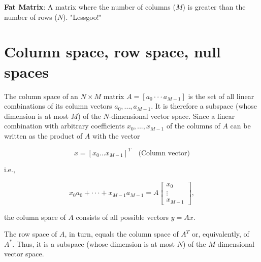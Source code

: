 \documentclass[a4paper, 12pt]{book}
\begin{document}
\begin{purplebox}
\textbf{Fat Matrix}: A matrix where the number of columns ($M$) is greater than the number of rows ($N$). "Lessgoo!"
\end{purplebox}

\section{Column space, row space, null spaces}

The column space of an $N \times M$ matrix $A=[a_{0} \cdot\cdot\cdot a_{M-1}]$ is the set of all linear combinations of its column vectors $a_{0},...,a_{M-1}.$ It is therefore a subspace (whose dimension is at most $M$) of the $N$-dimensional vector space. Since a linear combination with arbitrary coefficients $x_{0},...,x_{M-1}$ of the columns of $A$ can be written as the product of $A$ with the vector

\begin{equation}
    x = [x_0 \dots x_{M-1}]^T \quad \text{(Column vector)}
\end{equation}

i.e.,

\begin{equation}
    x_{0}a_{0}+\cdot\cdot\cdot+x_{M-1}a_{M-1} = A
    \begin{bmatrix}
    x_{0}\\
    \vdots\\
    x_{M-1}
    \end{bmatrix},
    \tag{B.1}
\end{equation}

the column space of $A$ consists of all possible vectors $y=Ax.$

The row space of $A$, in turn, equals the column space of $A^{T}$ or, equivalently, of $A^{*}.$ Thus, it is a subspace (whose dimension is at most $N$) of the $M$-dimensional vector space.
\end{document}
